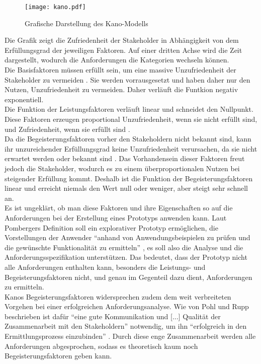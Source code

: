 \documentclass [12pt, a4paper, oneside, titlepage, ngerman]{article}
\begin{document}
\begin{figure}[H]
	\centering
	\texttt{[image: kano.pdf]}
	\caption{Grafische Darstellung des Kano-Modells}
	\cite[S.25]{PohlRupp2015}
	\label{img:kano}
\end{figure}
\noindent Die Grafik zeigt die Zufriedenheit der Stakeholder in Abhängigkeit von dem Erfüllungsgrad der jeweiligen Faktoren. Auf einer dritten Achse wird die Zeit dargestellt, wodurch die Anforderungen die Kategorien wechseln können. \\
Die Basisfaktoren müssen erfüllt sein, um eine massive Unzufriedenheit der Stakeholder zu vermeiden \cite[vgl. S.106]{Kano}. Sie werden vorrausgesetzt und haben daher nur den Nutzen, Unzufriedenheit zu vermeiden. Daher verläuft die Funtkion negativ exponentiell. \\
Die Funktion der Leistungsfaktoren verläuft linear und schneidet den Nullpunkt. Diese Faktoren erzeugen proportional Unzufriedenheit, wenn sie nicht erfüllt sind, und Zufriedenheit, wenn sie erfüllt sind \cite[vgl. S.106]{Kano}. \\
Da die Begeisterungsfaktoren vorher den Stakeholdern nicht bekannt sind, kann ihr unzureichender Erfüllungsgrad keine Unzufriedenheit verursachen, da sie nicht erwartet werden oder bekannt sind \cite[vgl. S.106]{Kano}. Das Vorhandensein dieser Faktoren freut jedoch die Stakeholder, wodurch es zu einem überproportionalen Nutzen bei steigender Erfüllung kommt. Deshalb ist die Funktion der Begeisterungsfaktoren linear und erreicht niemals den Wert null oder weniger, aber steigt sehr schnell an. \\

\noindent Es ist ungeklärt, ob man diese Faktoren und ihre Eigenschaften so auf die Anforderungen bei der Erstellung eines Prototyps anwenden kann. Laut Pombergers Definition soll ein explorativer Prototyp ermöglichen, die Vorstellungen der Anwender "`anhand von Anwendungsbeispielen zu prüfen und die gewünschte Funktionalität zu ermitteln"' \cite[S.27]{pomberger2004}, es soll also die Analyse und die Anforderungsspezifikation unterstützen. Das bedeutet, dass der Prototyp nicht alle Anforderungen enthalten kann, besonders die Leistungs- und Begeisterungsfaktoren nicht, und genau im Gegenteil dazu dient, Anforderungen zu ermitteln. \\
Kanos Begeisterungsfaktoren widersprechen zudem dem weit verbreiteten Vorgehen bei einer erfolgreichen Anforderungsanalyse. Wie von Pohl und Rupp beschrieben ist dafür "`eine gute Kommunikation und [...] Qualität der Zusammenarbeit mit den Stakeholdern"' \cite[S.33]{PohlRupp2015} notwendig, um ihn "`erfolgreich in den Ermittlungsprozess einzubinden"' \cite[S.34]{PohlRupp2015}. Durch diese enge Zusammenarbeit werden alle Anforderungen abgesprochen, sodass es theoretisch kaum noch Begeisterungsfaktoren geben kann.
\end{document}

